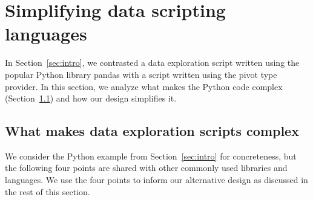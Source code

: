 \documentclass[a4paper,UKenglish]{lipics-v2016}
\theoremstyle{plain}
\theoremstyle{definition}
\begin{document}

\section{Simplifying data scripting languages}
\label{sec:analysis}

In Section~\ref{sec:intro}, we contrasted a data exploration script written using the popular Python 
library pandas \cite{pandas} with a script written using the pivot type provider. In this section, we 
analyze what makes the Python code complex (Section~\ref{sec:analysis-why}) and how our design simplifies it.

\subsection{What makes data exploration scripts complex}
\label{sec:analysis-why}

We consider the Python example from Section~\ref{sec:intro} for concreteness, but the following 
four points are shared with other commonly used libraries and languages. We use the four points to 
inform our alternative design as discussed in the rest of this section.
\end{document}
